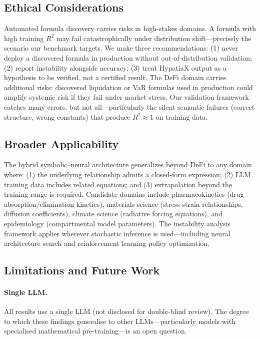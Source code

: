 \documentclass[twoside,11pt]{article}
\newcommand{\Rsq}{R^{2}}
\begin{document}
\subsection{Ethical Considerations}
\label{sec:disc_ethics}

Automated formula discovery carries risks in high-stakes domains. A formula with high training $\Rsq$ may fail catastrophically under distribution shift---precisely the scenario our benchmark targets. We make three recommendations: (1) never deploy a discovered formula in production without out-of-distribution validation; (2) report instability alongside accuracy; (3) treat HypatiaX output as a hypothesis to be verified, not a certified result. The DeFi domain carries additional risks: discovered liquidation or VaR formulas used in production could amplify systemic risk if they fail under market stress. Our validation framework catches many errors, but not all---particularly the silent semantic failures (correct structure, wrong constants) that produce $\Rsq \approx 1$ on training data.

\subsection{Broader Applicability}
\label{sec:disc_broader}

The hybrid symbolic--neural architecture generalizes beyond DeFi to any domain where: (1) the underlying relationship admits a closed-form expression; (2) LLM training data includes related equations; and (3) extrapolation beyond the training range is required. Candidate domains include pharmacokinetics (drug absorption/elimination kinetics), materials science (stress-strain relationships, diffusion coefficients), climate science (radiative forcing equations), and epidemiology (compartmental model parameters). The instability analysis framework applies wherever stochastic inference is used---including neural architecture search and reinforcement learning policy optimization.

\subsection{Limitations and Future Work}
\label{sec:limitations}

\paragraph{Single LLM.}
All results use a single LLM (not disclosed for double-blind review).
The degree to which these findings generalise to other LLMs---particularly
models with specialised mathematical pre-training---is an open question.
\end{document}
